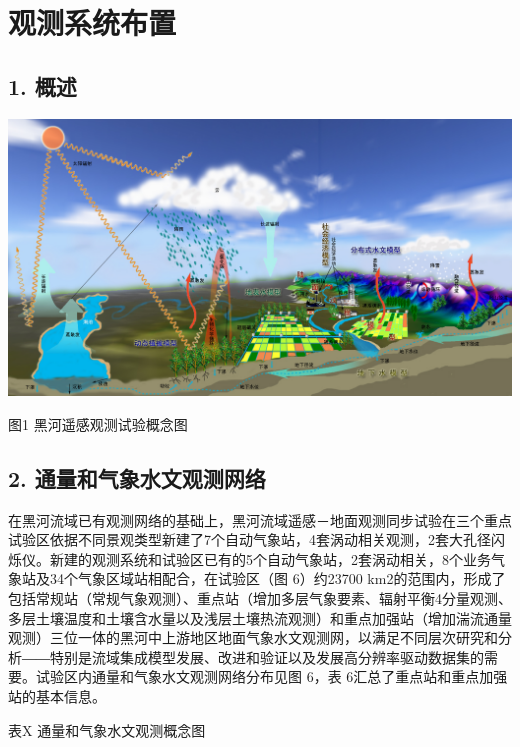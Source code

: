 \documentclass[letterpaper,10pt,english]{sphinxmanual}
\begin{document}
\chapter{观测系统布置}
\label{water_observe_system:water-observe-system}\label{water_observe_system::doc}\label{water_observe_system:id1}

\section{1. 概述}
\label{water_observe_system:id2}
{\hfill\includegraphics{observe_system.jpg}\hfill}

图1 黑河遥感观测试验概念图


\section{2. 通量和气象水文观测网络}
\label{water_observe_system:id3}
在黑河流域已有观测网络的基础上，黑河流域遥感－地面观测同步试验在三个重点试验区依据不同景观类型新建了7个自动气象站，4套涡动相关观测，2套大孔径闪烁仪。新建的观测系统和试验区已有的5个自动气象站，2套涡动相关，8个业务气象站及34个气象区域站相配合，在试验区（图 6）约23700 km2的范围内，形成了包括常规站（常规气象观测）、重点站（增加多层气象要素、辐射平衡4分量观测、多层土壤温度和土壤含水量以及浅层土壤热流观测）和重点加强站（增加湍流通量观测）三位一体的黑河中上游地区地面气象水文观测网，以满足不同层次研究和分析――特别是流域集成模型发展、改进和验证以及发展高分辨率驱动数据集的需要。试验区内通量和气象水文观测网络分布见图 6，表 6汇总了重点站和重点加强站的基本信息。

表X 通量和气象水文观测概念图
\end{document}
